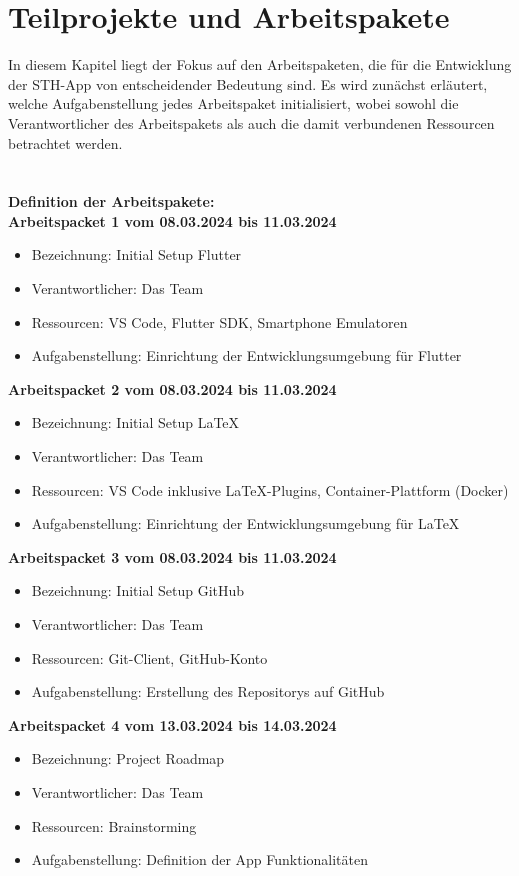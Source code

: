 \chapter{Teilprojekte und Arbeitspakete}
In diesem Kapitel liegt der Fokus auf den Arbeitspaketen, die für die Entwicklung der STH-App von entscheidender Bedeutung sind. Es wird zunächst erläutert, welche Aufgabenstellung jedes Arbeitspaket initialisiert, wobei sowohl die Verantwortlicher des Arbeitspakets als auch die damit verbundenen Ressourcen betrachtet werden.
\\
\\
\\
\textbf{Definition der Arbeitspakete:} \\

\textbf{Arbeitspacket 1 vom 08.03.2024 bis 11.03.2024}
\begin{itemize}[itemsep=0pt]
    \item{Bezeichnung: Initial Setup Flutter} 
    \item{Verantwortlicher: Das Team} 
    \item{Ressourcen: VS Code, Flutter SDK, Smartphone Emulatoren} 
    \item{Aufgabenstellung: Einrichtung der Entwicklungsumgebung für Flutter}
\end{itemize} 

\textbf{Arbeitspacket 2 vom 08.03.2024 bis 11.03.2024}
\begin{itemize}[itemsep=0pt]
    \item{Bezeichnung: Initial Setup LaTeX} 
	\item{Verantwortlicher: Das Team} 
	\item{Ressourcen: VS Code inklusive LaTeX-Plugins, Container-Plattform (Docker)} 
	\item{Aufgabenstellung: Einrichtung der Entwicklungsumgebung für LaTeX}
\end{itemize}

\textbf{Arbeitspacket 3 vom 08.03.2024 bis 11.03.2024}
\begin{itemize}[itemsep=0pt]
    \item{Bezeichnung: Initial Setup GitHub} 
	\item{Verantwortlicher: Das Team} 
	\item{Ressourcen: Git-Client, GitHub-Konto} 
	\item{Aufgabenstellung: Erstellung des Repositorys auf GitHub}
\end{itemize}

\textbf{Arbeitspacket 4 vom 13.03.2024 bis 14.03.2024}
\begin{itemize}[itemsep=0pt]
    \item{Bezeichnung: Project Roadmap} 
	\item{Verantwortlicher: Das Team} 
	\item{Ressourcen: Brainstorming} 
	\item{Aufgabenstellung: Definition der App Funktionalitäten}
\end{itemize} 

